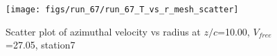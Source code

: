 \begin{figure}[H]
\centering
\texttt{[image: figs/run\_67/run\_67\_T\_vs\_r\_mesh\_scatter]}
\caption{Scatter plot of azimuthal velocity vs radius at $z/c$=10.00, $V_{free}$=27.05, station7}
\label{fig:run_67_T_vs_r_mesh_scatter}
\end{figure}


